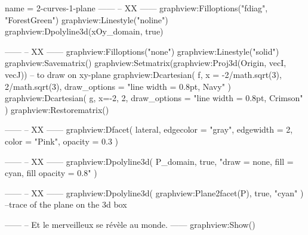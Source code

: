 \documentclass[border = 3pt]{standalone}
\begin{document}
\begin{luadraw}{name = 2-curves-1-plane}
------
-- XX
------
    graphview:Filloptions("fdiag", "ForestGreen")
    graphview:Linestyle("noline")
    graphview:Dpolyline3d(xOy_domain, true)

------
-- XX
------
    graphview:Filloptions("none")
    graphview:Linestyle("solid")
    graphview:Savematrix()
        graphview:Setmatrix(graphview:Proj3d({Origin, vecI, vecJ})) -- to draw on xy-plane
        graphview:Dcartesian(
            f,
            {x = {-2/math.sqrt(3), 2/math.sqrt(3)},
            draw_options = "line width = 0.8pt, Navy"
        })
        graphview:Dcartesian(
            g,
            {x={-2, 2},
            draw_options = "line width = 0.8pt, Crimson"
        })
    graphview:Restorematrix()

------
-- XX
------
    graphview:Dfacet(
        lateral,
        {
            edgecolor = "gray",
            edgewidth = 2,
            color     = "Pink",
            opacity   = 0.3
        })

------
-- XX
------
    graphview:Dpolyline3d(
        P_domain,
        true,
        "draw = none, fill = cyan, fill opacity = 0.8"
    )

------
-- XX
------
    graphview:Dpolyline3d(
        graphview:Plane2facet(P),
        true,
        "cyan"
     ) --trace of the plane on the 3d box

------
-- Et le merveilleux se révèle au monde.
------
    graphview:Show()
\end{luadraw}
\end{document}
